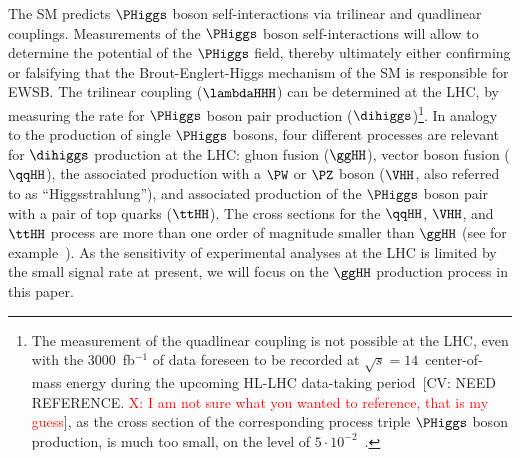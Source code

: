 The SM predicts $\PHiggs$ boson self-interactions via trilinear and quadlinear couplings. 
Measurements of the $\PHiggs$ boson self-interactions will allow to determine the potential of the $\PHiggs$ field,
thereby ultimately either confirming or falsifying that the Brout-Englert-Higgs mechanism of the SM is responsible for EWSB.
The trilinear coupling ($\lambdaHHH$) can be determined at the LHC, by measuring the rate for $\PHiggs$ boson pair production ($\dihiggs$)\footnote{The measurement of the quadlinear coupling is not possible at the LHC, 
even with the $3000$~fb$^{-1}$ of data foreseen to be recorded at $\sqrt{s}=14$~\TeV center-of-mass energy during the upcoming HL-LHC data-taking period~\cite{Cepeda:2019klc}[CV: NEED REFERENCE. \textcolor{red}{X: I am not sure what you wanted to reference, that is my guess}],
as the cross section of the corresponding process triple $\PHiggs$ boson production, is much too small, 
on the level of $5 \cdot 10^{-2}$~\cite{Plehn:2005nk,Binoth:2006ym}. }. 
In analogy to the production of single $\PHiggs$ bosons, 
four different processes are relevant for $\dihiggs$ production at the LHC: 
gluon fusion ($\ggHH$), vector boson fusion ($\qqHH$), the associated production with a $\PW$ or $\PZ$ boson ($\VHH$, also referred to as ``Higgsstrahlung''),
and associated production of the $\PHiggs$ boson pair with a pair of top quarks ($\ttHH$). The cross sections for the $\qqHH$, $\VHH$, and $\ttHH$ process are more than one order of magnitude smaller than  $\ggHH$ (see for example~\cite{Baglio:2012np}).
As the sensitivity of experimental analyses at the LHC is limited by the small signal rate at present,
we will focus on the $\ggHH$ production process in this paper.

